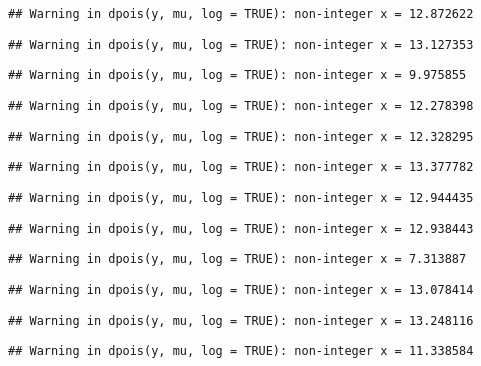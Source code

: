 \documentclass[
]{article}
\begin{document}
\begin{verbatim}
## Warning in dpois(y, mu, log = TRUE): non-integer x = 12.872622
\end{verbatim}

\begin{verbatim}
## Warning in dpois(y, mu, log = TRUE): non-integer x = 13.127353
\end{verbatim}

\begin{verbatim}
## Warning in dpois(y, mu, log = TRUE): non-integer x = 9.975855
\end{verbatim}

\begin{verbatim}
## Warning in dpois(y, mu, log = TRUE): non-integer x = 12.278398
\end{verbatim}

\begin{verbatim}
## Warning in dpois(y, mu, log = TRUE): non-integer x = 12.328295
\end{verbatim}

\begin{verbatim}
## Warning in dpois(y, mu, log = TRUE): non-integer x = 13.377782
\end{verbatim}

\begin{verbatim}
## Warning in dpois(y, mu, log = TRUE): non-integer x = 12.944435
\end{verbatim}

\begin{verbatim}
## Warning in dpois(y, mu, log = TRUE): non-integer x = 12.938443
\end{verbatim}

\begin{verbatim}
## Warning in dpois(y, mu, log = TRUE): non-integer x = 7.313887
\end{verbatim}

\begin{verbatim}
## Warning in dpois(y, mu, log = TRUE): non-integer x = 13.078414
\end{verbatim}

\begin{verbatim}
## Warning in dpois(y, mu, log = TRUE): non-integer x = 13.248116
\end{verbatim}

\begin{verbatim}
## Warning in dpois(y, mu, log = TRUE): non-integer x = 11.338584
\end{verbatim}
\end{document}
